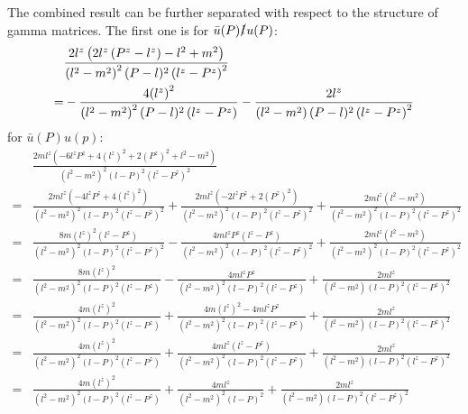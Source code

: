\documentclass{article}
\begin{document}
The combined result can be further separated with respect to the structure of gamma matrices. The first one is for $\bar u(P)\slashed{l}u(P)$:
\begin{align*}
	  & \frac{2 l^z \left(2 l^z \left(P^z-l^z\right)-l^2+m^2\right)}{\left(l^2-m^2\right)^2 (P-l)^2\left(l^z-P^z\right)^2}                             \\
	= & -\frac{4 \pqty{l^z}^2  }{\left(l^2-m^2\right)^2 (P-l)^2\left(l^z-P^z\right)}-\frac{2 l^z }{\left(l^2-m^2\right) (P-l)^2\left(l^z-P^z\right)^2} \\
\end{align*}
for $\bar u(P)u(p)$:
\begin{align*}
	  & \frac{2 m l^z \left(-6 l^z P^z+4 \left(l^z\right)^2+2 \left(P^z\right)^2+l^2-m^2\right)}{\left(l^2-m^2\right)^2(l-P)^2 \left(l^z-P^z\right)^2} \\
	= & \frac{2 m l^z \left(-4 l^z P^z+4 \left(l^z\right)^2\right)}{\left(l^2-m^2\right)^2(l-P)^2 \left(l^z-P^z\right)^2}
	+\frac{2 m l^z \left(-2 l^z P^z+2 \left(P^z\right)^2\right)}{\left(l^2-m^2\right)^2(l-P)^2 \left(l^z-P^z\right)^2}
	+\frac{2 m l^z \left(l^2-m^2\right)}{\left(l^2-m^2\right)^2(l-P)^2 \left(l^z-P^z\right)^2}\\
	= & \frac{8 m \left(l^z\right)^2 \left( l^z-  P^z\right)}{\left(l^2-m^2\right)^2(l-P)^2 \left(l^z-P^z\right)^2}
	-\frac{4 m l^z P^z\left( l^z - P^z\right)}{\left(l^2-m^2\right)^2(l-P)^2 \left(l^z-P^z\right)^2}
	+\frac{2 m l^z \left(l^2-m^2\right)}{\left(l^2-m^2\right)^2(l-P)^2 \left(l^z-P^z\right)^2}\\
	= & \frac{8 m \left(l^z\right)^2 }{\left(l^2-m^2\right)^2(l-P)^2 \left(l^z-P^z\right)}
	-\frac{4 m l^z P^z}{\left(l^2-m^2\right)^2(l-P)^2 \left(l^z-P^z\right)}
	+\frac{2 m l^z }{\left(l^2-m^2\right)(l-P)^2 \left(l^z-P^z\right)^2}\\
	= & \frac{4 m \left(l^z\right)^2 }{\left(l^2-m^2\right)^2(l-P)^2 \left(l^z-P^z\right)}
	+\frac{4 m \left(l^z\right)^2-4 m l^z P^z}{\left(l^2-m^2\right)^2(l-P)^2 \left(l^z-P^z\right)}
	+\frac{2 m l^z }{\left(l^2-m^2\right)(l-P)^2 \left(l^z-P^z\right)^2}\\
	= & \frac{4 m \left(l^z\right)^2 }{\left(l^2-m^2\right)^2(l-P)^2 \left(l^z-P^z\right)}
	+\frac{4 m l^z\left(l^z-  P^z\right)}{\left(l^2-m^2\right)^2(l-P)^2 \left(l^z-P^z\right)}
	+\frac{2 m l^z }{\left(l^2-m^2\right)(l-P)^2 \left(l^z-P^z\right)^2}\\
	= & \frac{4 m \left(l^z\right)^2 }{\left(l^2-m^2\right)^2(l-P)^2 \left(l^z-P^z\right)}
	+\frac{4 m l^z}{\left(l^2-m^2\right)^2(l-P)^2 }
	+\frac{2 m l^z }{\left(l^2-m^2\right)(l-P)^2 \left(l^z-P^z\right)^2}
\end{align*}
\end{document}
